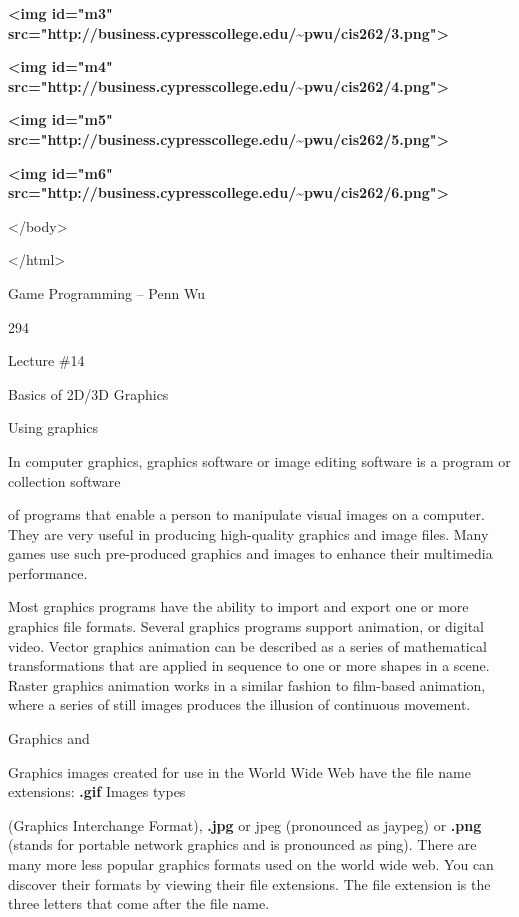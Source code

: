 \documentclass[
]{article}
\begin{document}
\textbf{\textless img id="m3"
src="http://business.cypresscollege.edu/\textasciitilde pwu/cis262/3.png"\textgreater{}}

\textbf{\textless img id="m4"
src="http://business.cypresscollege.edu/\textasciitilde pwu/cis262/4.png"\textgreater{}}

\textbf{\textless img id="m5"
src="http://business.cypresscollege.edu/\textasciitilde pwu/cis262/5.png"\textgreater{}}

\textbf{\textless img id="m6"
src="http://business.cypresscollege.edu/\textasciitilde pwu/cis262/6.png"\textgreater{}}

\textless/body\textgreater{}

\textless/html\textgreater{}

Game Programming -- Penn Wu

294

\protect\hypertarget{index_split_015.htmlux5cux23p295}{}{}

Lecture \#14

Basics of 2D/3D Graphics

Using graphics

In computer graphics, graphics software or image editing software is a
program or collection software

of programs that enable a person to manipulate visual images on a
computer. They are very useful in producing high-quality graphics and
image files. Many games use such pre-produced graphics and images to
enhance their multimedia performance.

Most graphics programs have the ability to import and export one or more
graphics file formats. Several graphics programs support animation, or
digital video. Vector graphics animation can be described as a series of
mathematical transformations that are applied in sequence to one or more
shapes in a scene. Raster graphics animation works in a similar fashion
to film-based animation, where a series of still images produces the
illusion of continuous movement.

Graphics and

Graphics images created for use in the World Wide Web have the file name
extensions: \textbf{.gif} Images types

(Graphics Interchange Format), \textbf{.jpg} or jpeg (pronounced as
jaypeg) or \textbf{.png} (stands for portable network graphics and is
pronounced as \textquotesingle ping\textquotesingle). There are many
more less popular graphics formats used on the world wide web. You can
discover their formats by viewing their file extensions. The file
extension is the three letters that come after the file name.
\end{document}
